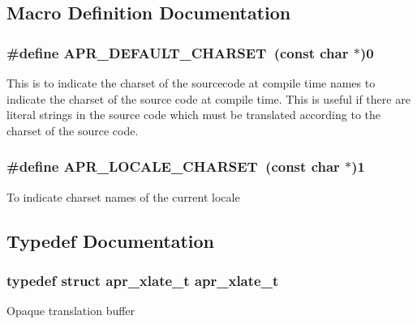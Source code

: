 \subsection{Macro Definition Documentation}
\hypertarget{group___a_p_r___x_l_a_t_e_ga3276c680eb0917ff51ff22c9b9959fa9}{
\subsubsection[{A\-P\-R\-\_\-\-D\-E\-F\-A\-U\-L\-T\-\_\-\-C\-H\-A\-R\-S\-E\-T}]{\setlength{\rightskip}{0pt plus 5cm}\#define A\-P\-R\-\_\-\-D\-E\-F\-A\-U\-L\-T\-\_\-\-C\-H\-A\-R\-S\-E\-T~(const char $\ast$)0}}\label{group___a_p_r___x_l_a_t_e_ga3276c680eb0917ff51ff22c9b9959fa9}
This is to indicate the charset of the sourcecode at compile time names to indicate the charset of the source code at compile time. This is useful if there are literal strings in the source code which must be translated according to the charset of the source code. \hypertarget{group___a_p_r___x_l_a_t_e_ga0e46c333fb1c900f0dd4a78664f5a0de}{
\subsubsection[{A\-P\-R\-\_\-\-L\-O\-C\-A\-L\-E\-\_\-\-C\-H\-A\-R\-S\-E\-T}]{\setlength{\rightskip}{0pt plus 5cm}\#define A\-P\-R\-\_\-\-L\-O\-C\-A\-L\-E\-\_\-\-C\-H\-A\-R\-S\-E\-T~(const char $\ast$)1}}\label{group___a_p_r___x_l_a_t_e_ga0e46c333fb1c900f0dd4a78664f5a0de}
To indicate charset names of the current locale 

\subsection{Typedef Documentation}
\hypertarget{group___a_p_r___x_l_a_t_e_ga069dabbadc30e3a4157c38104a250e77}{
\subsubsection[{apr\-\_\-xlate\-\_\-t}]{\setlength{\rightskip}{0pt plus 5cm}typedef struct {\bf apr\-\_\-xlate\-\_\-t} {\bf apr\-\_\-xlate\-\_\-t}}}\label{group___a_p_r___x_l_a_t_e_ga069dabbadc30e3a4157c38104a250e77}
Opaque translation buffer 

